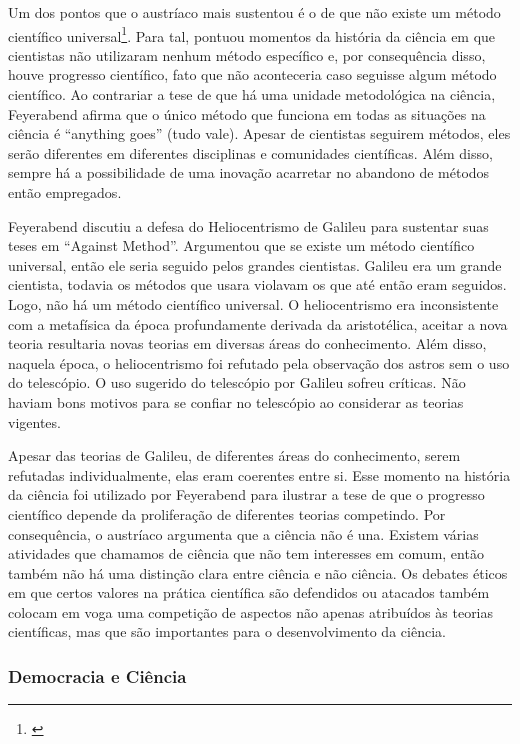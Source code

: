 \documentclass[12pt]{report}
\begin{document}
			Um dos pontos que o austríaco mais sustentou é o de que não existe um método científico universal\footnote{\cite{feyerabend-against-method}}. Para tal, pontuou momentos da história da ciência em que cientistas não utilizaram nenhum método específico e, por consequência disso, houve progresso científico, fato que não aconteceria caso seguisse algum método científico. Ao contrariar a tese de que há uma unidade metodológica na ciência, Feyerabend afirma que o único método que funciona em todas as situações na ciência é ``anything goes'' (tudo vale). Apesar de cientistas seguirem métodos, eles serão diferentes em diferentes disciplinas e comunidades científicas. Além disso, sempre há a possibilidade de uma inovação acarretar no abandono de métodos então empregados.
			
			Feyerabend discutiu a defesa do Heliocentrismo de Galileu para sustentar suas teses em ``Against Method''.
			Argumentou que se existe um método científico universal, então ele seria seguido pelos grandes cientistas. Galileu era um grande cientista, todavia os métodos que usara violavam os que até então eram seguidos. Logo, não há um método científico universal. O heliocentrismo era inconsistente com a metafísica da época profundamente derivada da aristotélica, aceitar a nova teoria resultaria novas teorias em diversas áreas do conhecimento. Além disso, naquela época, o heliocentrismo foi refutado pela observação dos astros sem o uso do telescópio. O uso sugerido do telescópio por Galileu sofreu críticas. Não haviam bons motivos para se confiar no telescópio ao considerar as teorias vigentes.
			
			Apesar das teorias de Galileu, de diferentes áreas do conhecimento, serem refutadas individualmente, elas eram coerentes entre si. Esse momento na história da ciência foi utilizado por Feyerabend para ilustrar a tese de que o progresso científico depende da proliferação de diferentes teorias competindo. Por consequência, o austríaco argumenta que a ciência não é una. Existem várias atividades que chamamos de ciência que não tem interesses em comum, então também não há uma distinção clara entre ciência e não ciência. Os debates éticos em que certos valores na prática científica são defendidos ou atacados também colocam em voga uma competição de aspectos não apenas atribuídos às teorias científicas, mas que são importantes para o desenvolvimento da ciência.
			
		\subsubsection{Democracia e Ciência}
		
\end{document}
